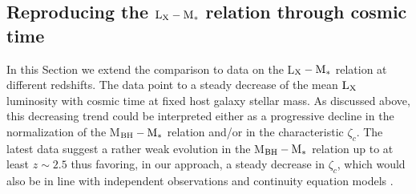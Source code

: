 

\subsection{Reproducing the ${\rm L}_{\rm X}-{\rm M}_*$ relation through cosmic time}

In this Section we extend the comparison to data on the L$_{\rm X}-{\rm M}_*$ relation at different redshifts. The data point to a steady decrease of the mean ${\rm L}_{\rm X}$ luminosity with cosmic time at fixed host galaxy stellar mass. As discussed above, this decreasing trend could be interpreted either as a progressive decline in the normalization of the M$_{\rm BH}-{\rm M}_*$ relation and/or in the characteristic $\zeta_c$. The latest data suggest a rather weak evolution in the M$_{\rm BH}-{\rm M}_*$ relation up to at least $z\sim 2.5$ \citep[e.g.,][]{Suh20,Shankar20MNRAS} thus favoring, in our approach, a steady decrease in $\zeta_c$, which would also be in line with independent observations \citep[]{Kollmeier06} and continuity equation models \citep[][]{Shankar13Acc,Aversa15}.

